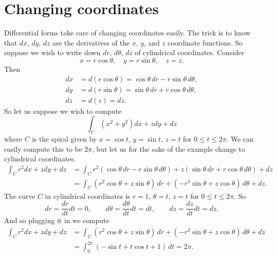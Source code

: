 \documentclass[12pt]{article}
\begin{document}
\section*{Changing coordinates}

Differential forms take care of changing coordinates easily.  The trick is
to know that $dx$, $dy$, $dz$ are the derivatives of the $x$, $y$, and $z$ coordinate
functions.  So suppose we wish to write down $dr$, $d\theta$, $dz$ of cylindrical coordinates.
Consider
\[
x = r \cos \theta, \quad y = r \sin \theta, \quad z = z .
\]
Then
\begin{align*}
dx & = d(r \cos \theta) = \cos \theta \, dr - r \sin \theta \, d \theta , \\
dy & = d(r \sin \theta) = \sin \theta \, dr + r \cos \theta \, d \theta , \\
dz & = d(z) = dz .
\end{align*}
So let us suppose we wish to compute
\[
\int_C (x^2+y^2) dx + z dy + dz
\]
where $C$ is the spiral given by $x = \cos t$, $y = \sin t$, $z = t$ for $0 \leq t \leq 2 \pi$.
We can easily compute this to be $2 \pi$, but let us for the sake of the example
change to cylindrical coordinates.
\begin{equation*}
\begin{split}
\int_C r^2 dx + z dy + dz
& =
\int_C r^2 (\cos \theta \, dr - r \sin \theta \, d \theta)
+ z (\sin \theta \, dr + r \cos \theta \, d \theta)
+ dz
\\
& =
\int_C ( r^2 \cos \theta + z \sin \theta) \, dr
+ (- r^3 \sin \theta + z \cos \theta ) \, d\theta
+ dz .
\end{split}
\end{equation*}
The curve $C$ in cylindrical coordinates is $r =1$, $\theta = t$, $z = t$ for $0 \leq t \leq 2 \pi$.
So
\[
dr = \frac{dr}{dt} dt = 0,
\qquad
d\theta = \frac{d\theta}{dt} dt = dt,
\qquad
dz = \frac{dz}{dt} dt = dz.
\]
And so plugging it in we compute
\begin{equation*}
\begin{split}
\int_C r^2 dx + z dy + dz
& =
\int_C ( r^2 \cos \theta + z \sin \theta) \, dr
+ (- r^3 \sin \theta + z \cos \theta ) \, d\theta
+ dz
\\
& =
\int_0^{2\pi}
(- \sin t + t \cos t + 1 ) \, dt
= 2 \pi .
\end{split}
\end{equation*}
\end{document}
